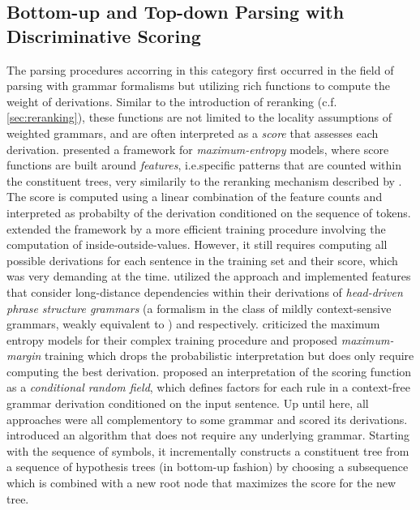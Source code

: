 \documentclass[../document.tex]{subfiles}
\begin{document}
    \subsection{Bottom-up and Top-down Parsing with Discriminative Scoring}\label{sec:literature:chart}
    The parsing procedures accorring in this category first occurred in the field of parsing with grammar formalisms but utilizing rich functions to compute the weight of derivations.
    Similar to the introduction of reranking (c.f.\@ \cref{sec:reranking}), these functions are not limited to the locality assumptions of weighted grammars, and are often interpreted as a \emph{score} that assesses each derivation.
    \citet{Johnson99} presented a framework for \emph{maximum-entropy} models, where score functions are built around \emph{features}, i.e.\@ specific patterns that are counted within the constituent trees, very similarily to the reranking mechanism described by \citet{collins2001convolution}.
    The score is computed using a linear combination of the feature counts and interpreted as probabilty of the derivation conditioned on the sequence of tokens.
    \citet{Miyao02} extended the framework by a more efficient training procedure involving the computation of inside-outside-values.
    However, it still requires computing all possible derivations for each sentence in the training set and their score, which was very demanding at the time.
    \citet{Toutanova02,Clark04a} utilized the approach and implemented features that consider long-distance dependencies within their derivations of \emph{head-driven phrase structure grammars} (a formalism in the class of mildly context-sensive grammars, weakly equivalent to ) and  respectively.
    \citet{Taskar04} criticized the maximum entropy models for their complex training procedure and proposed \emph{maximum-margin} training which drops the probabilistic interpretation but does only require computing the best derivation.
    \citet{Finkel08} proposed an interpretation of the scoring function as a \emph{conditional random field}, which defines factors for each rule in a context-free grammar derivation conditioned on the input sentence.
    Up until here, all approaches were all complementory to some grammar and scored its derivations.
    \citet{Turian06} introduced an algorithm that does not require any underlying grammar.
    Starting with the sequence of  symbols, it incrementally constructs a constituent tree from a sequence of hypothesis trees (in bottom-up fashion) by choosing a subsequence which is combined with a new root node that maximizes the score for the new tree.
\end{document}
